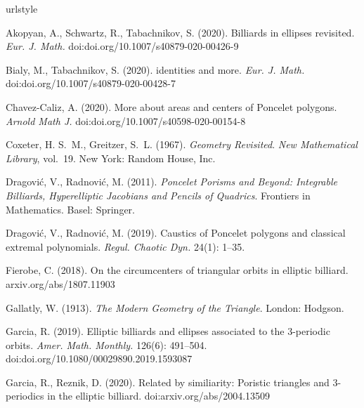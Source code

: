 \begin{thebibliography}{10}
\expandafter\ifx\csname urlstyle\endcsname\relax
 \providecommand{\url}[1]{doi:\discretionary{}{}{}#1}\else
 \providecommand{\url}{doi:\discretionary{}{}{}\begingroup
  \urlstyle{rm}\Url}\fi

Akopyan, A., Schwartz, R., Tabachnikov, S. (2020).
\newblock Billiards in ellipses revisited.
\newblock \emph{Eur. J. Math.}
\newblock \url{doi.org/10.1007/s40879-020-00426-9}

Bialy, M., Tabachnikov, S. (2020).
 identities and more.
\newblock \emph{Eur. J. Math.}
\newblock \url{doi.org/10.1007/s40879-020-00428-7}

Chavez-Caliz, A. (2020).
\newblock More about areas and centers of {P}oncelet polygons.
\newblock \emph{Arnold Math J.}
\newblock \url{doi.org/10.1007/s40598-020-00154-8}

Coxeter, H. S.~M., Greitzer, S.~L. (1967).
\newblock \emph{Geometry Revisited}. \emph{New Mathematical
  Library}, vol.~19.
\newblock New York: Random House, Inc.

Dragovi\'{c}, V., Radnovi\'{c}, M. (2011).
\newblock \emph{{P}oncelet Porisms and Beyond: Integrable Billiards,
  Hyperelliptic Jacobians and Pencils of Quadrics}.
\newblock Frontiers in Mathematics. Basel: Springer.

Dragovi\'{c}, V., Radnovi\'{c}, M. (2019).
\newblock Caustics of {P}oncelet polygons and classical extremal polynomials.
\newblock \emph{Regul. Chaotic Dyn.} 24(1): 1--35.

Fierobe, C. (2018).
\newblock On the circumcenters of triangular orbits in elliptic billiard.
\newblock arxiv.org/abs/1807.11903

Gallatly, W. (1913).
\newblock \emph{The Modern Geometry of the Triangle}.
\newblock London: Hodgson.

Garcia, R. (2019).
\newblock Elliptic billiards and ellipses associated to the 3-periodic orbits.
\newblock \emph{Amer. Math. Monthly.} 126(6): 491--504.
\newblock \url{doi.org/10.1080/00029890.2019.1593087}

Garcia, R., Reznik, D. (2020).
\newblock Related by similiarity: Poristic triangles and 3-periodics in the
  elliptic billiard.
\newblock \url{arxiv.org/abs/2004.13509}


\end{thebibliography}
